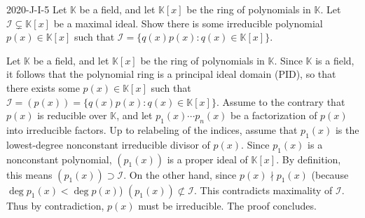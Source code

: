 \documentclass{article}
\begin{document}
	\begin{prb}{2020-J-I-5}
		Let $\mathbb{K}$ be a field, and let $\mathbb{K}[x]$ be the ring of polynomials in $\mathbb{K}$. Let $\mathscr{I} \subsetneq \mathbb{K}[x]$ be a maximal ideal. Show there is some irreducible polynomial $p(x) \in \mathbb{K}[x]$ such that $\mathscr{I} = \{q(x)p(x): q(x) \in \mathbb{K}[x]\}$. 
	\end{prb}
	Let $\mathbb{K}$ be a field, and let $\mathbb{K}[x]$ be the ring of polynomials in $\mathbb{K}$. Since $\mathbb{K}$ is a field, it follows that the polynomial ring is a principal ideal domain (PID), so that there exists some $p(x) \in \mathbb{K}[x]$ such that $\mathscr{I} = (p(x)) = \{q(x)p(x): q(x) \in \mathbb{K}[x]\}$. Assume to the contrary that $p(x)$ is reducible over $\mathbb{K}$, and let $p_{1}(x) \dotsm p_{n}(x)$ be a factorization of $p(x)$ into irreducible factors. Up to relabeling of the indices, assume that $p_{1}(x)$ is the lowest-degree nonconstant irreducible divisor of $p(x)$. Since $p_{1}(x)$ is a nonconstant polynomial, $(p_{1}(x))$ is a proper ideal of $\mathbb{K}[x]$. By definition, this means $(p_{1}(x)) \supset \mathscr{I}$. On the other hand, since $p(x) \nmid p_{1}(x)$ (because $\deg{p_{1}(x)} < \deg{p(x)}$) $(p_{1}(x)) \not \subset \mathscr{I}$. This contradicts maximality of $\mathscr{I}$. Thus by contradiction, $p(x)$ must be irreducible. The proof concludes. 
	
\end{document}
